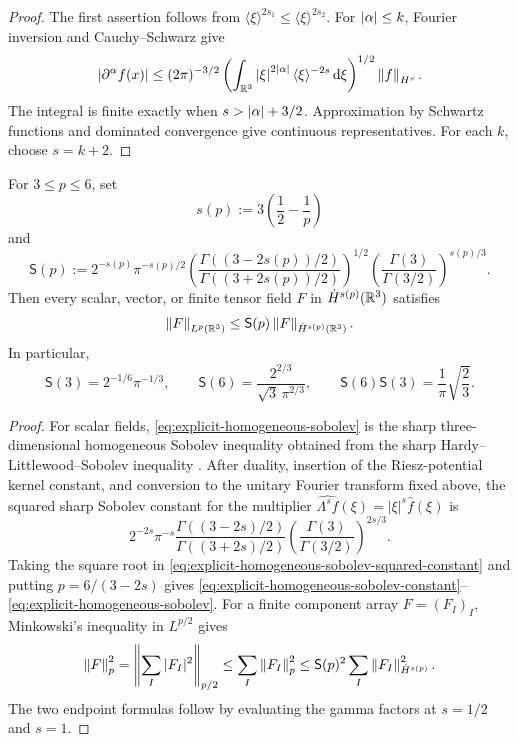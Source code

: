 \begin{proof}
The first assertion follows from
\(\langle\xi\rangle^{2s_1}\le\langle\xi\rangle^{2s_2}\).
For \(\left|\alpha\right|\le k\), Fourier inversion and Cauchy--Schwarz give
\[
 \left|\partial^\alpha f(x)\right|
 \le(2\pi)^{-3/2}
 \left(\int_{\mathbb R^3}\left|\xi\right|^{2\left|\alpha\right|}
 \langle\xi\rangle^{-2s}\,\mathrm d\xi\right)^{1/2}
 \left\lVert f\right\rVert_{H^s}.
\]
The integral is finite exactly when \(s>\left|\alpha\right|+3/2\).
Approximation by Schwartz functions and dominated convergence give continuous
representatives.  For each \(k\), choose \(s=k+2\).
\end{proof}

\begin{lemma}
\label{lem:explicit-homogeneous-sobolev}
For \(3\le p\le6\), set
\[
 s(p):=3\left(\frac12-\frac1p\right)
\]
and
\begin{equation}
 \mathsf S(p):=
 2^{-s(p)}\pi^{-s(p)/2}
 \left(
  \frac{\Gamma((3-2s(p))/2)}
       {\Gamma((3+2s(p))/2)}
 \right)^{1/2}
 \left(\frac{\Gamma(3)}{\Gamma(3/2)}\right)^{s(p)/3}.
 \label{eq:explicit-homogeneous-sobolev-constant}
\end{equation}
Then every scalar, vector, or finite tensor field \(F\) in
\(\dot H^{s(p)}(\mathbb R^3)\) satisfies
\begin{equation}
 \left\lVert F\right\rVert_{L^p(\mathbb R^3)}
 \le \mathsf S(p)\left\lVert F\right\rVert_{\dot H^{s(p)}(\mathbb R^3)}.
 \label{eq:explicit-homogeneous-sobolev}
\end{equation}
In particular,
\[
 \mathsf S(3)=2^{-1/6}\pi^{-1/3},
 \qquad
 \mathsf S(6)=\frac{2^{2/3}}{\sqrt3\,\pi^{2/3}},
 \qquad
 \mathsf S(6)\mathsf S(3)=\frac1\pi\sqrt{\frac23}.
\]
\end{lemma}

\begin{proof}
For scalar fields, \eqref{eq:explicit-homogeneous-sobolev} is the sharp
three-dimensional homogeneous Sobolev inequality obtained from the sharp
Hardy--Littlewood--Sobolev inequality \cite{Lieb1983}.  After duality,
insertion of the Riesz-potential kernel constant, and conversion to the
unitary Fourier transform fixed above, the squared sharp Sobolev constant for
the multiplier
\(\widehat{\Lambda^sf}(\xi)=|\xi|^s\widehat f(\xi)\) is
\begin{equation}
 2^{-2s}\pi^{-s}
 \frac{\Gamma((3-2s)/2)}{\Gamma((3+2s)/2)}
 \left(\frac{\Gamma(3)}{\Gamma(3/2)}\right)^{2s/3}.
 \label{eq:explicit-homogeneous-sobolev-squared-constant}
\end{equation}
Taking the square root in
\eqref{eq:explicit-homogeneous-sobolev-squared-constant} and putting
\(p=6/(3-2s)\) gives
\eqref{eq:explicit-homogeneous-sobolev-constant}--
\eqref{eq:explicit-homogeneous-sobolev}.  For a finite component array
\(F=(F_I)_I\), Minkowski's inequality in \(L^{p/2}\) gives
\[
 \left\lVert F\right\rVert_p^2
 =\left\|\sum_I|F_I|^2\right\|_{p/2}
 \le\sum_I\left\lVert F_I\right\rVert_p^2
 \le\mathsf S(p)^2\sum_I\left\lVert F_I\right\rVert_{\dot H^{s(p)}}^2.
\]
The two endpoint formulas follow by evaluating the gamma factors at
\(s=1/2\) and \(s=1\).
\end{proof}

